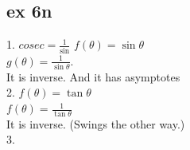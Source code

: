 \documentclass{article}
\begin{document}
  \subsection{ex 6n}
  1. $cosec=\frac{1}{\sin}$
  $f(\theta)=\sin\theta$\\
  $g(\theta)=\frac{1}{\sin\theta}$.\\
  It is inverse. And it has asymptotes\\
  2. $f(\theta)=\tan\theta$\\
  $f(\theta)=\frac{1}{\tan\theta}$\\
  It is inverse. (Swings the other way.)\\
  3.  



  

   
\end{document}
